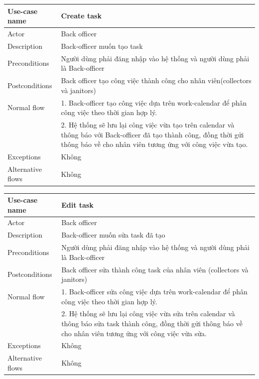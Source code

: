 \documentclass[a4paper]{article}
\begin{document}
\begin{enumerate}
\begin{tabular}{|p{3cm}|p{10cm}|}
     Use-case name & Create task \\
     \hline
     Actor & Back officer\\
     \hline
     Description & Back-officer muốn tạo task \\
     \hline
     Preconditions & Người dùng phải đăng nhập vào hệ thống và người dùng phải là Back-officer\\
          \hline
     Postconditions & Back officer tạo công việc thành công cho nhân viên(collectors và janitors) \\
     \hline
     Normal flow & 1. Back-officer tạo công việc dựa trên work-calendar để phân công việc theo thời gian hợp lý. \\
     & 2. Hệ thống sẽ lưu lại công việc vừa tạo trên calendar và thông báo với Back-officer đã tạo thành công, đồng thời gửi thông báo về cho nhân viên tương ứng với công việc vừa tạo. \\
     \hline
     Exceptions & Không\\
     \hline
     Alternative flows & Không\\
     \hline
\end{tabular}
\vspace{0.5cm}

\begin{tabular}{|p{3cm}|p{10cm}|}
     \hline
     Use-case name & Edit task \\
     \hline
     Actor & Back officer\\
     \hline
     Description & Back-officer muốn sửa task đã tạo \\
     \hline
     Preconditions & Người dùng phải đăng nhập vào hệ thống và người dùng phải là Back-officer\\
               \hline
     Postconditions & Back officer sửa thành công task của nhân viên (collectors và janitors)\\
     \hline
     Normal flow & 1. Back-officer sửa công việc dựa trên work-calendar để phân công việc theo thời gian hợp lý. \\
     & 2. Hệ thống sẽ lưu lại công việc vừa sửa trên calendar và thông báo sửa task thành công, đồng thời gửi thông báo về cho nhân viên tương ứng với công việc vừa sửa. \\
     \hline
     Exceptions & Không\\
     \hline
     Alternative flows & Không\\
     \hline
\end{tabular}

\vspace{0.5cm}


\end{enumerate}
\end{document}
